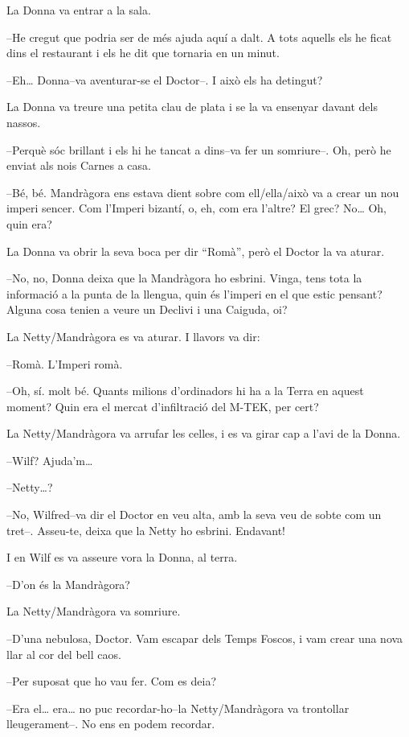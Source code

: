 La Donna va entrar a la sala.

--He cregut que podria ser de més ajuda aquí a dalt. A tots aquells els
he ficat dins el restaurant i els he dit que tornaria en un minut.

--Eh\ldots{} Donna--va aventurar-se el Doctor--. I això els ha detingut?

La Donna va treure una petita clau de plata i se la va ensenyar davant
dels nassos.

--Perquè sóc brillant i els hi he tancat a dins--va fer un somriure--.
Oh, però he enviat als nois Carnes a casa.

--Bé, bé. Mandràgora ens estava dient sobre com ell/ella/això va a crear
un nou imperi sencer. Com l'Imperi bizantí, o, eh, com era l'altre? El
grec? No\ldots{} Oh, quin era?

La Donna va obrir la seva boca per dir ``Romà'', però el Doctor la va
aturar.

--No, no, Donna deixa que la Mandràgora ho esbrini. Vinga, tens tota la
informació a la punta de la llengua, quin és l'imperi en el que estic
pensant? Alguna cosa tenien a veure un Declivi i una Caiguda, oi?

La Netty/Mandràgora es va aturar. I llavors va dir:

--Romà. L'Imperi romà.

--Oh, sí. molt bé. Quants milions d'ordinadors hi ha a la Terra en
aquest moment? Quin era el mercat d'infiltració del M-TEK, per cert?

La Netty/Mandràgora va arrufar les celles, i es va girar cap a l'avi de
la Donna.

--Wilf? Ajuda'm\ldots{}

--Netty\ldots{}?

--No, Wilfred--va dir el Doctor en veu alta, amb la seva veu de sobte
com un tret--. Asseu-te, deixa que la Netty ho esbrini. Endavant!

I en Wilf es va asseure vora la Donna, al terra.

--D'on és la Mandràgora?

La Netty/Mandràgora va somriure.

--D'una nebulosa, Doctor. Vam escapar dels Temps Foscos, i vam crear una
nova llar al cor del bell caos.

--Per suposat que ho vau fer. Com es deia?

--Era el\ldots{} era\ldots{} no puc recordar-ho--la Netty/Mandràgora va
trontollar lleugerament--. No ens en podem recordar.

